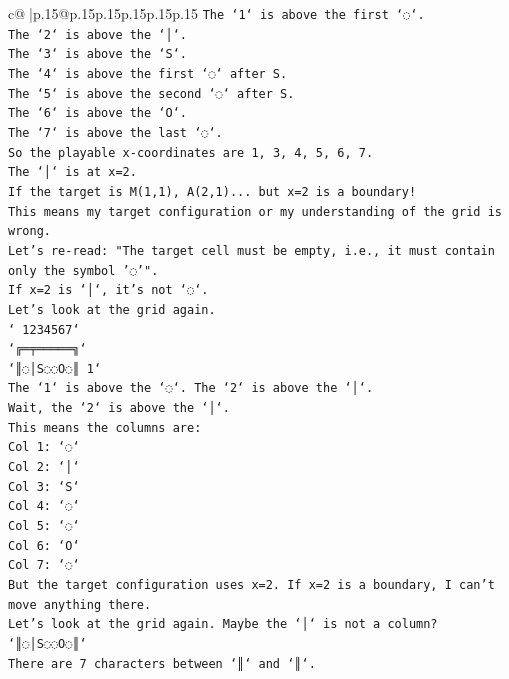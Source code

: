 \documentclass{article}
\begin{document}
{\begin{supertabular}{c@{$\;$}|p{.15\linewidth}@{}p{.15\linewidth}p{.15\linewidth}p{.15\linewidth}p{.15\linewidth}p{.15\linewidth}}
{{{\texttt{The `1` is above the first `◌`.} \\
\texttt{The `2` is above the `│`.} \\
\texttt{The `3` is above the `S`.} \\
\texttt{The `4` is above the first `◌` after S.} \\
\texttt{The `5` is above the second `◌` after S.} \\
\texttt{The `6` is above the `O`.} \\
\texttt{The `7` is above the last `◌`.} \\
\texttt{So the playable x{-}coordinates are 1, 3, 4, 5, 6, 7.} \\
\texttt{The `│` is at x=2.} \\
\texttt{If the target is M(1,1), A(2,1)... but x=2 is a boundary!} \\
\texttt{This means my target configuration or my understanding of the grid is wrong.} \\
\texttt{Let's re{-}read: "The target cell must be empty, i.e., it must contain only the symbol '◌'".} \\
\texttt{If x=2 is `│`, it's not `◌`.} \\
\texttt{Let's look at the grid again.} \\
\texttt{` 1234567`} \\
\texttt{`╔═╤═════╗`} \\
\texttt{`║◌│S◌◌O◌║ 1`} \\
\texttt{The `1` is above the `◌`. The `2` is above the `│`.} \\
\texttt{Wait, the `2` is above the `│`.} \\
\texttt{This means the columns are:} \\
\texttt{Col 1: `◌`} \\
\texttt{Col 2: `│`} \\
\texttt{Col 3: `S`} \\
\texttt{Col 4: `◌`} \\
\texttt{Col 5: `◌`} \\
\texttt{Col 6: `O`} \\
\texttt{Col 7: `◌`} \\
\texttt{But the target configuration uses x=2. If x=2 is a boundary, I can't move anything there.} \\
\texttt{Let's look at the grid again. Maybe the `│` is not a column?} \\
\texttt{`║◌│S◌◌O◌║`} \\
\texttt{There are 7 characters between `║` and `║`.} \\
}}}
\end{supertabular}}
\end{document}

